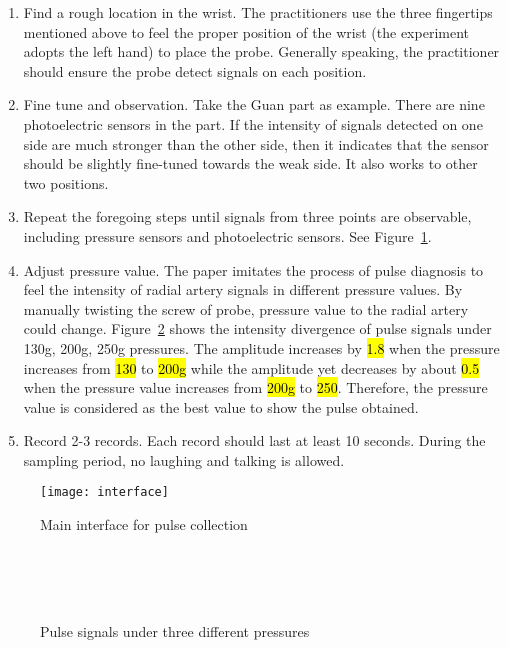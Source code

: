 \begin{enumerate}[(1)]
    \item Find a rough location in the wrist. The
    practitioners use the three fingertips mentioned above to feel the
    proper position of the wrist (the experiment adopts the left
    hand) to place the probe. Generally speaking, the practitioner
    should ensure the probe detect signals on each position. 
    \item Fine tune and observation. 
        Take the Guan part as example. There are nine photoelectric
        sensors in the part. If the intensity of signals detected
        on one side are much stronger than the other side, then 
        it indicates that the sensor should be slightly fine-tuned
        towards the weak side. It also works to other two positions.
    \item Repeat the foregoing steps until signals from three points
        are observable, including pressure sensors and photoelectric
        sensors. See Figure~\ref{fig:interface}.
    \item Adjust pressure value. The paper imitates the process of 
        pulse diagnosis to feel the intensity of radial artery signals 
        in different pressure values. By manually twisting the screw
        of probe, pressure value to the radial artery could change. 
        Figure~\ref{fig:pressure} shows the intensity divergence of pulse
        signals under 130g, 200g, 250g pressures. The amplitude
        increases by \hl{1.8} when
        the pressure increases from \hl{130} to \hl{200g}
        while the amplitude yet decreases by about \hl{0.5} when the
        pressure value increases from \hl{200g} to \hl{250}.
        Therefore, the pressure value is considered as the best value to
        show the pulse obtained.
    \item Record 2-3 records. Each record should last at least 10
        seconds. During the sampling period, no laughing and talking
        is allowed. 
\end{enumerate}
\begin{figure}[htpb]
    \begin{center}
        \texttt{[image: interface]}
    \end{center}
    \caption{Main interface for pulse collection}
    \label{fig:interface}
\end{figure}

\begin{figure}[htbp]
    \centering
    \\
    \\
    \\
    \caption{Pulse signals under three different pressures}
    \label{fig:pressure}
\end{figure}

